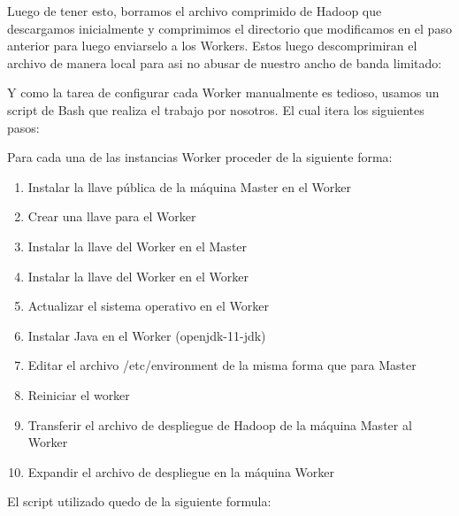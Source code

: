 \documentclass[9pt,letterpaper,twoside]{article}
\begin{document}
\begin{code}[H]
    
\end{code}

\noindent
Luego de tener esto, borramos el archivo comprimido de Hadoop que descargamos inicialmente y comprimimos el directorio que modificamos en el paso anterior para
luego enviarselo a los Workers. Estos luego descomprimiran el archivo de manera local para asi no abusar de nuestro ancho de banda limitado:

\begin{code}[H]
    
\end{code}

\noindent
Y como la tarea de configurar cada Worker manualmente es tedioso, usamos un script de Bash que realiza el trabajo por nosotros. El cual itera los siguientes pasos:

\noindent
Para cada una de las instancias Worker proceder de la siguiente forma:

\begin{enumerate}
\item Instalar la llave pública de la máquina Master en el Worker
\item Crear una llave para el Worker
\item Instalar la llave del Worker en el Master
\item Instalar la llave del Worker en el Worker
\item Actualizar el sistema operativo en el Worker
\item Instalar Java en el Worker (openjdk-11-jdk)
\item Editar el archivo /etc/environment de la misma forma que para Master
\item Reiniciar el worker
\item Transferir el archivo de despliegue de Hadoop de la máquina Master al Worker
\item Expandir el archivo de despliegue en la máquina Worker
\end{enumerate}

\noindent
El script utilizado quedo de la siguiente formula:

\begin{code}[H]
    
\end{code}
\end{document}
